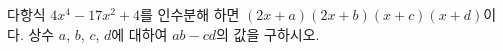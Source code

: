 다항식 $4x^4-17x^2+4$를 인수분해 하면 $(2x+a)(2x+b)(x+c)(x+d)$이다. 상수 $a$, $b$, $c$, $d$에 대하여 $ab-cd$의 값을 구하시오.
